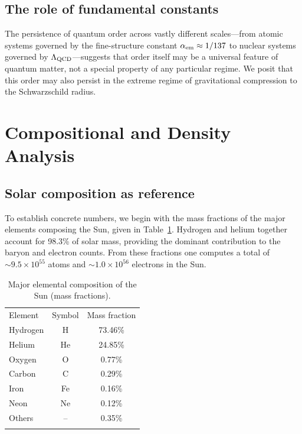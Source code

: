 \documentclass[epj]{svjour}
\begin{document}
\subsection{The role of fundamental constants}
\label{sec:constants}

The persistence of quantum order across vastly different scales---from atomic systems governed by the fine-structure constant $\alpha_{\rm em} \approx 1/137$ to nuclear systems governed by $\Lambda_{\rm QCD}$---suggests that order itself may be a universal feature of quantum matter, not a special property of any particular regime. We posit that this order may also persist in the extreme regime of gravitational compression to the Schwarzschild radius.

\section{Compositional and Density Analysis}
\label{sec:density}

\subsection{Solar composition as reference}
\label{sec:solar}

To establish concrete numbers, we begin with the mass fractions of the major elements composing the Sun, given in Table~\ref{tab:solar}. Hydrogen and helium together account for 98.3\% of solar mass, providing the dominant contribution to the baryon and electron counts. From these fractions one computes a total of $\sim 9.5 \times 10^{55}$ atoms and $\sim 1.0 \times 10^{56}$ electrons in the Sun.

\begin{table}
\centering
\caption{Major elemental composition of the Sun (mass fractions).}
\label{tab:solar}
\begin{tabular}{lcc}
\hline\noalign{\smallskip}
Element & Symbol & Mass fraction \\
\noalign{\smallskip}\hline\noalign{\smallskip}
Hydrogen & H  & 73.46\% \\
Helium   & He & 24.85\% \\
Oxygen   & O  & 0.77\% \\
Carbon   & C  & 0.29\% \\
Iron     & Fe & 0.16\% \\
Neon     & Ne & 0.12\% \\
Others   & -- & 0.35\% \\
\noalign{\smallskip}\hline
\end{tabular}
\end{table}
\end{document}

